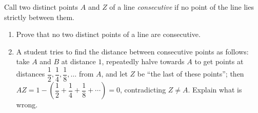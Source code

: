 Call two distinct points $A$ and $Z$ of a line \emph{consecutive} if no point of the line lies strictly between them.
\begin{enumerate}
\item[(a)] Prove that no two distinct points of a line are consecutive.
\item[(b)] A student tries to find the distance between consecutive points as follows: take $A$ and $B$ at distance $1$, repeatedly halve towards $A$ to get points at distances $\dfrac{1}{2},\dfrac{1}{4},\dfrac{1}{8},\dots$ from $A$, and let $Z$ be ``the last of these points''; then $AZ=1-\left(\dfrac{1}{2}+\dfrac{1}{4}+\dfrac{1}{8}+\cdots\right)=0$, contradicting $Z\ne A$. Explain what is wrong.
\end{enumerate}
